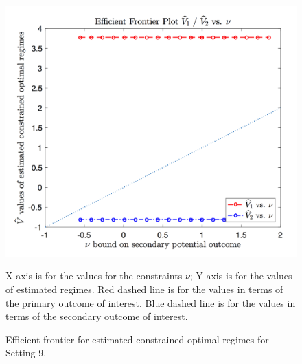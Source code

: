 \documentclass{article}
\begin{document}
\begin{appendices}
\begin{figure}[!htb]
	\includegraphics[width=.9\linewidth]{./figs/efficient_plot9.png}
	\caption{Efficient frontier for estimated constrained optimal regimes for Setting 9.}
	\label{fig:9}
	\justify
X-axis is for the values for the constraints $\nu$; Y-axis is for the values of estimated regimes. Red dashed line is for the values in terms of the primary outcome of interest. Blue dashed line is for the values in terms of the secondary outcome of interest.
\end{figure}
\end{appendices}
\end{document}
